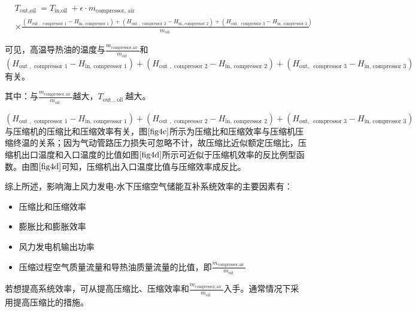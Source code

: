 \documentclass{jnuthesis}
\begin{document}
	\begin{equation}\label{f35}
		\begin{aligned}
			&T_{\text {out,oil }}=T_{\text {in,oil }}+\epsilon \cdot m_{\text {compressor, air }}\\
			&\times \frac{\left(H_{\text {out }, \text { compressor } 1}-H_{\text {in, compressor } 1}\right)+\left(H_{\text {out }, \text { compressor } 2}-H_{\text {in, compressor } 2}\right)+\left(H_{\text {out, } \text { compressor } 3}-H_{\text {in, compressor } 3}\right)}{m_{\text {oil }}}
		\end{aligned}
	\end{equation}
	
	\par 可见，高温导热油的温度与$ \frac{m_{\text {compressor,air }}}{m_{\text {oil }}} $和$\left(H_{\text {out }, \text { compressor } 1}-H_{\text {in, compressor } 1}\right)+\left(H_{\text {out }, \text { compressor } 2}-H_{\text {in, compressor } 2}\right)+\left(H_{\text {out, } \text { compressor } 3}-H_{\text {in, compressor } 3}\right)  $有关。
	\par 其中：与$ \frac{m_{\text {compressor,air }}}{m_{\text {oil }}} $越大，$ T_{\text {out }, \text { oil }} $越大。
	\par $\left(H_{\text {out }, \text { compressor } 1}-H_{\text {in, compressor } 1}\right)+\left(H_{\text {out }, \text { compressor } 2}-H_{\text {in, compressor } 2}\right)+\left(H_{\text {out, } \text { compressor } 3}-H_{\text {in, compressor } 3}\right)  $与压缩机的压缩比和压缩效率有关，图$ \fontsize{10.5bp}{10pt}\ref{fig4c} $所示为压缩比和压缩效率与压缩机压缩终温的关系；因为气动管路压力损失可忽略不计，故压缩比近似额定压缩比，压缩机出口温度和入口温度的比值如图$ \fontsize{10.5bp}{10pt}\ref{fig4d} $所示可近似于压缩机效率的反比例型函数。由图$ \fontsize{10.5bp}{10pt}\ref{fig4d} $可知，压缩机出入口温度比值与压缩效率成反比。
	
	\par 综上所述，影响海上风力发电-水下压缩空气储能互补系统效率的主要因素有：
	\begin{itemize}
		\item 压缩比和压缩效率
		\item 膨胀比和膨胀效率
		\item 风力发电机输出功率
		\item 压缩过程空气质量流量和导热油质量流量的比值，即$ \frac{m_{\text {compressor,air }}}{m_{\text {oil }}} $
	\end{itemize}
	
	\par 若想提高系统效率，可从提高压缩比、压缩效率和$ \frac{m_{\text {compressor,air }}}{m_{\text {oil }}} $入手。通常情况下采用提高压缩比的措施。
	
\end{document}
